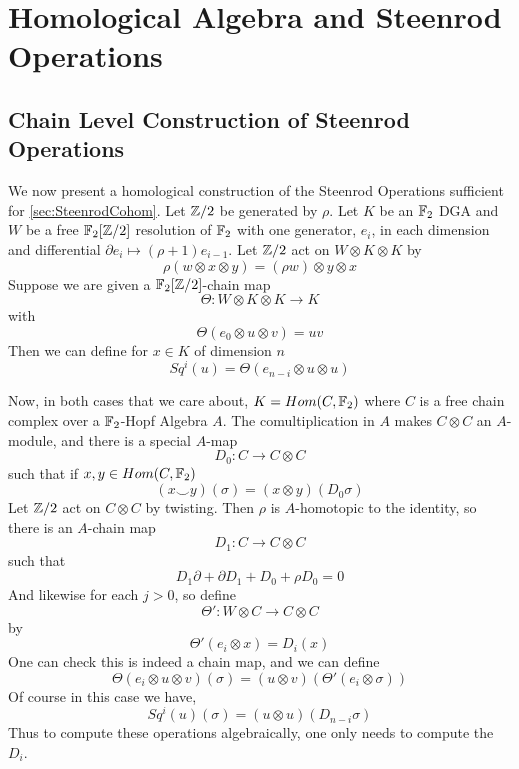 

\section{Homological Algebra and Steenrod Operations}

\subsection{Chain Level Construction of Steenrod Operations}
\label{sec:SteenrodConstruction}

We now present a homological construction of the Steenrod Operations sufficient for \ref{sec:SteenrodCohom}.  
Let $\mathbb{Z}/2$ be generated by $\rho$.
Let $K$ be an $\mathbb{F}_2$ DGA and $W$ be a free $\mathbb{F}_2[\mathbb{Z}/2]$ resolution of $\mathbb{F}_2$ with one generator, $e_i$, in each dimension and differential $\partial e_i\mapsto (\rho+1)e_{i-1}$.  
Let $\mathbb{Z}/2$ act on $W\otimes K\otimes K$ by
\[\rho(w\otimes x\otimes y)=(\rho w)\otimes y\otimes x\]
Suppose we are given a $\mathbb{F}_2[\mathbb{Z}/2]$-chain map 
\[\Theta : W\otimes K\otimes K\to K\]
with 
\[\Theta(e_0\otimes u\otimes v)=uv\]
Then we can define for $x\in K$ of dimension $n$
\[Sq^i(u)=\Theta(e_{n-i}\otimes u\otimes u)\]

Now, in both cases that we care about, $K=Hom(C,\mathbb{F}_2)$ where $C$ is a free chain complex over a $\mathbb{F}_2$-Hopf Algebra $A$.  
The comultiplication in $A$ makes $C\otimes C$ an $A$-module, and there is a special $A$-map 
\[D_0:C\to C\otimes C\]
such that if $x,y\in Hom(C,\mathbb{F}_2)$
\[(x\smile y)(\sigma)=(x\otimes y)(D_0\sigma)\]
Let $\mathbb{Z}/2$ act on $C\otimes C$ by twisting.  Then $\rho$ is $A$-homotopic to the identity, so there is an $A$-chain map 
\[D_1:C\to C\otimes C\]
such that
\[D_1\partial+\partial D_1 + D_0+\rho D_0=0\]
And likewise for each $j>0$, so define
\[\Theta' : W\otimes C\to C\otimes C\]
by 
\[\Theta'(e_i\otimes x)=D_i(x)\]
One can check this is indeed a chain map, and we can define
\[\Theta(e_i\otimes u\otimes v)(\sigma) = (u\otimes v)(\Theta'(e_i\otimes \sigma))\]
Of course in this case we have,
\[Sq^i(u)(\sigma)=(u\otimes u)(D_{n-i}\sigma)\]
Thus to compute these operations algebraically, one only needs to compute the $D_i$.  

